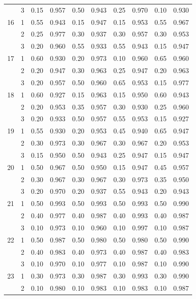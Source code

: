\begin{longtable}{llcccccccc}
   & 3 & 0.15 & 0.957 & 0.50 & 0.943 & 0.25 & 0.970 & 0.10 & 0.930 \\ 
  16 & 1 & 0.55 & 0.943 & 0.15 & 0.947 & 0.15 & 0.953 & 0.55 & 0.967 \\ 
   & 2 & 0.25 & 0.977 & 0.30 & 0.937 & 0.30 & 0.957 & 0.30 & 0.953 \\ 
   & 3 & 0.20 & 0.960 & 0.55 & 0.933 & 0.55 & 0.943 & 0.15 & 0.947 \\ 
  17 & 1 & 0.60 & 0.930 & 0.20 & 0.973 & 0.10 & 0.960 & 0.65 & 0.960 \\ 
   & 2 & 0.20 & 0.947 & 0.30 & 0.963 & 0.25 & 0.947 & 0.20 & 0.963 \\ 
   & 3 & 0.20 & 0.957 & 0.50 & 0.960 & 0.65 & 0.953 & 0.15 & 0.977 \\ 
  18 & 1 & 0.60 & 0.927 & 0.15 & 0.963 & 0.15 & 0.950 & 0.60 & 0.943 \\ 
   & 2 & 0.20 & 0.953 & 0.35 & 0.957 & 0.30 & 0.930 & 0.25 & 0.960 \\ 
   & 3 & 0.20 & 0.933 & 0.50 & 0.957 & 0.55 & 0.953 & 0.15 & 0.927 \\ 
  19 & 1 & 0.55 & 0.930 & 0.20 & 0.953 & 0.45 & 0.940 & 0.65 & 0.947 \\ 
   & 2 & 0.30 & 0.973 & 0.30 & 0.967 & 0.30 & 0.967 & 0.20 & 0.953 \\ 
   & 3 & 0.15 & 0.950 & 0.50 & 0.943 & 0.25 & 0.947 & 0.15 & 0.947 \\ 
  20 & 1 & 0.50 & 0.967 & 0.50 & 0.950 & 0.15 & 0.947 & 0.45 & 0.957 \\ 
   & 2 & 0.30 & 0.967 & 0.30 & 0.967 & 0.30 & 0.973 & 0.35 & 0.950 \\ 
   & 3 & 0.20 & 0.970 & 0.20 & 0.937 & 0.55 & 0.943 & 0.20 & 0.943 \\ 
  21 & 1 & 0.50 & 0.993 & 0.50 & 0.993 & 0.50 & 0.993 & 0.50 & 0.990 \\ 
   & 2 & 0.40 & 0.977 & 0.40 & 0.987 & 0.40 & 0.993 & 0.40 & 0.987 \\ 
   & 3 & 0.10 & 0.973 & 0.10 & 0.960 & 0.10 & 0.997 & 0.10 & 0.987 \\ 
  22 & 1 & 0.50 & 0.987 & 0.50 & 0.980 & 0.50 & 0.980 & 0.50 & 0.990 \\ 
   & 2 & 0.40 & 0.983 & 0.40 & 0.973 & 0.40 & 0.987 & 0.40 & 0.983 \\ 
   & 3 & 0.10 & 0.970 & 0.10 & 0.977 & 0.10 & 0.987 & 0.10 & 0.990 \\ 
  23 & 1 & 0.30 & 0.973 & 0.30 & 0.987 & 0.30 & 0.993 & 0.30 & 0.990 \\ 
   & 2 & 0.10 & 0.980 & 0.10 & 0.983 & 0.10 & 0.983 & 0.10 & 0.987 \\ 

\end{longtable}
